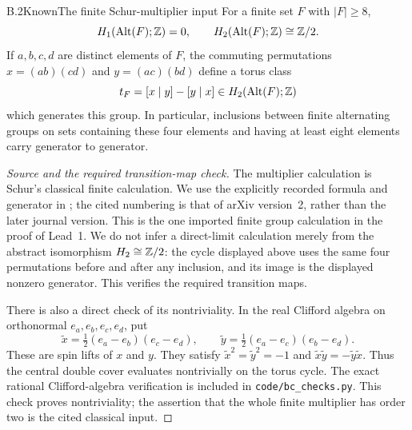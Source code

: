 \begin{claim}{B.2}{Known}{The finite Schur-multiplier input}
For a finite set $F$ with $|F|\geq8$,
\[
 H_1(\operatorname{Alt}(F);\mathbb Z)=0,
 \qquad H_2(\operatorname{Alt}(F);\mathbb Z)\cong\mathbb Z/2.
\]
If $a,b,c,d$ are distinct elements of $F$, the commuting permutations
$x=(ab)(cd)$ and $y=(ac)(bd)$ define a torus class
\[
 t_F=[x\mid y]-[y\mid x]\in H_2(\operatorname{Alt}(F);\mathbb Z)
\]
which generates this group.  In particular, inclusions between finite
alternating groups on sets containing these four elements and having at
least eight elements carry generator to generator.
\end{claim}
\begin{proof}[Source and the required transition-map check]
The multiplier calculation is Schur's classical finite calculation.  We
use the explicitly recorded formula and generator in
\citet[Eq.~(35), Proposition~20, and Corollary~21]{BC_DominguezSegovia2021};
the cited numbering is that of arXiv version~2, rather than the later
journal version.  This is the one imported finite group calculation in
the proof of Lead~1.  We do not infer a direct-limit calculation merely
from the abstract isomorphism $H_2\cong\mathbb Z/2$: the cycle displayed above
uses the same four permutations before and after any inclusion, and its
image is the displayed nonzero generator.  This verifies the required
transition maps.

There is also a direct check of its nontriviality.  In the real Clifford
algebra on orthonormal $e_a,e_b,e_c,e_d$, put
\[
 \widetilde x=\tfrac12(e_a-e_b)(e_c-e_d),\qquad
 \widetilde y=\tfrac12(e_a-e_c)(e_b-e_d).
\]
These are spin lifts of $x$ and $y$.  They satisfy
$\widetilde x^2=\widetilde y^2=-1$ and
$\widetilde x\widetilde y=-\widetilde y\widetilde x$.
Thus the central double cover evaluates nontrivially on the torus cycle.
The exact rational Clifford-algebra verification is included in
\texttt{code/bc\_checks.py}.  This check proves nontriviality; the assertion
that the whole finite multiplier has order two is the cited classical
input.
\end{proof}

